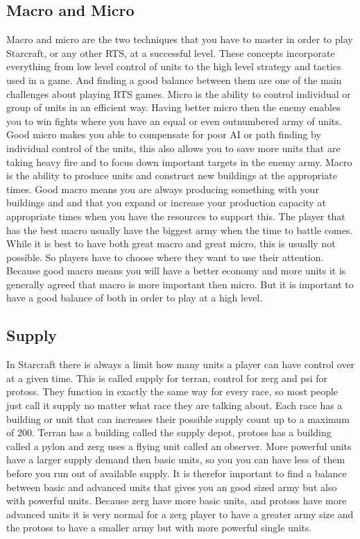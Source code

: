 \subsection{Macro and Micro}
Macro and micro are the two techniques that you have to master in order to play Starcraft, or any other RTS, at a successful level. These concepts incorporate everything from low level control of units to the high level strategy and tactics used in a game. And finding a good balance between them are one of the main challenges about playing RTS games. 
Micro is the ability to control individual or group of units in an efficient way. Having better micro then the enemy enables you to win fights where you have an equal or even outnumbered army of units. Good micro makes you able to compensate for poor AI or path finding by individual control of the units, this also allows you to save more units that are taking heavy fire and to focus down important targets in the enemy army. 
Macro is the ability to produce units and construct new buildings at the appropriate times. Good macro means you are always producing something with your buildings and and that you expand or increase your production capacity at appropriate times when you have the resources to support this. The player that has the best macro usually have the biggest army when the time to battle comes. 
While it is best to have both great macro and great micro, this is usually not possible. So players have to choose where they want to use their attention. Because good macro means you will have a better economy and more units it is generally agreed that macro is more important then micro. But it is important to have a good balance of both in order to play at a high level. 


\subsection{Supply}
In Starcraft there is always a limit how many units a player can have control over at a given time. This is called supply for terran, control for zerg and psi for protoss. They function in exactly the same way for every race, so most people just call it supply no matter what race they are talking about. Each race has a building or unit that can increases their possible supply count up to a maximum of 200. Terran has a building called the supply depot, protoss has a building called a pylon and zerg uses a flying unit called an observer. More powerful units have a larger supply demand then basic units, so you you can have less of them before you run out of available supply. It is therefor important to find a balance between basic and advanced units that gives you an good sized army but also with powerful units. Because zerg have more basic units, and protoss have more advanced units it is very normal for a zerg player to have a greater army size and the protoss to have a smaller army but with more powerful single units. 

